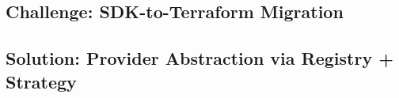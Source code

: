 \subsection{Challenge: SDK-to-Terraform Migration}
%
%

\subsection{Solution: Provider Abstraction via Registry + Strategy}
%
%
%
%
%
%
%
%

